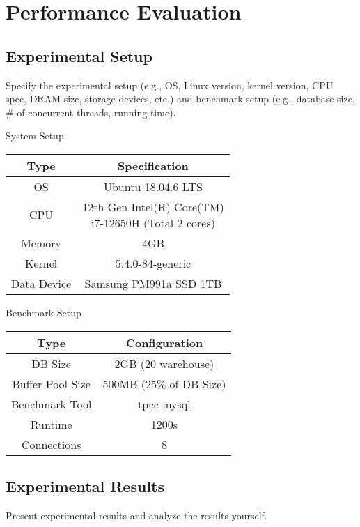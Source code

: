 \section{Performance Evaluation}

\subsection{Experimental Setup}
Specify the experimental setup (e.g., OS, Linux version,
kernel version, CPU spec, DRAM size, storage devices, etc.) 
and benchmark setup (e.g., database size, \# of concurrent threads, 
running time).

System Setup
\begin{center}
    \begin{tabular}{ | c | c | }
    \hline
        \textbf{Type} & \textbf{Specification} \\
    \hline
        OS & Ubuntu 18.04.6 LTS \\
    \hline
        CPU & \makecell{12th Gen Intel(R) Core(TM) \\ i7-12650H 
        (Total 2 cores)} \\
    \hline
        Memory & 4GB \\
    \hline
        Kernel & 5.4.0-84-generic \\
    \hline
        Data Device & Samsung PM991a SSD 1TB \\
    \hline
    \end{tabular}
\end{center}
%
Benchmark Setup
\begin{center}
    \begin{tabular}{ | c | c | }
    \hline
        \textbf{Type} & \textbf{Configuration} \\
    \hline
        DB Size & 2GB (20 warehouse) \\
    \hline
        Buffer Pool Size & 500MB (25\% of DB Size) \\
    \hline
        Benchmark Tool & tpcc-mysql \\
    \hline
        Runtime & 1200s \\
    \hline
        Connections & 8 \\
    \hline
    \end{tabular}
\end{center}

\subsection{Experimental Results}
Present experimental results and analyze the results yourself.